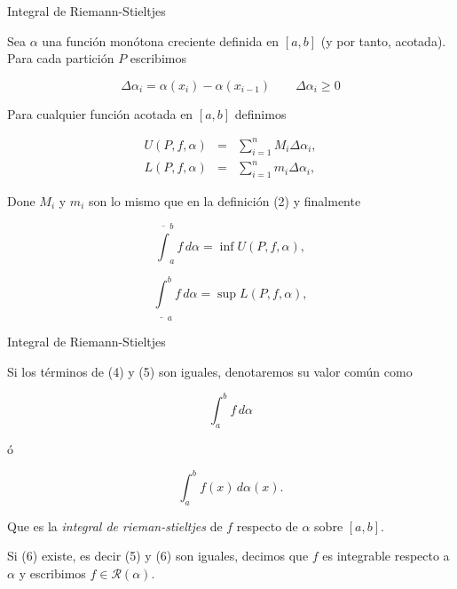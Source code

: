 \documentclass[11pt]{beamer}
\begin{document}
\begin{frame}{Integral de Riemann-Stieltjes}

Sea $\alpha$ una función monótona creciente definida en $[a, b]$ (y por tanto, acotada). Para cada partición $P$ escribimos

\[
	\Delta \alpha_i = \alpha(x_i) - \alpha(x_{i-1}) \qquad \Delta\alpha_i \geq 0
\]

Para cualquier función acotada en $[a, b]$ definimos

\[
	\begin{array}{rcl}
		U(P, f, \alpha) & = & \sum_{i=1}^n M_i \Delta \alpha_i, \\
		L(P, f, \alpha) & = & \sum_{i=1}^n m_i \Delta \alpha_i,
	\end{array}
\]

Done $M_i$ y $m_i$ son lo mismo que en la definición (2) y finalmente 

\begin{equation}
	\overline{\int}_a^b f\,d\alpha = \inf U(P, f, \alpha),
\end{equation}

\begin{equation}
	\underline{\int}_a^b f\,d\alpha = \sup L(P, f, \alpha),
\end{equation}

\end{frame}

\begin{frame}{Integral de Riemann-Stieltjes}

\begin{definition}[4]

Si los términos de (4) y (5) son iguales, denotaremos su valor común como

\begin{equation}
	\int_a^b f\,d\alpha
\end{equation}

ó

\begin{equation}
	\int_a^b f(x)\,d\alpha(x).
\end{equation}

Que es la \textit{integral de rieman-stieltjes} de $f$ respecto de $\alpha$ sobre $[a, b]$.

Si (6) existe, es decir (5) y (6) son iguales, decimos que $f$ es integrable respecto a $\alpha$ y escribimos $f \in \mathcal{R}(\alpha)$.

\end{definition}

\end{frame}
\end{document}
